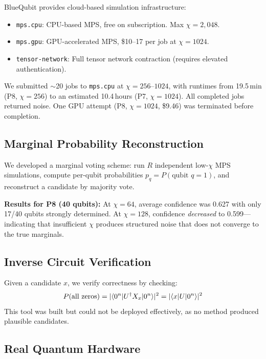 \documentclass[11pt,a4paper]{article}
\newcommand{\bd}{\chi}
\begin{document}
BlueQubit provides cloud-based simulation infrastructure:
\begin{itemize}[nosep]
    \item \texttt{mps.cpu}: CPU-based MPS, free on subscription. Max $\bd = 2{,}048$.
    \item \texttt{mps.gpu}: GPU-accelerated MPS, \$10--17 per job at $\bd = 1024$.
    \item \texttt{tensor-network}: Full tensor network contraction (requires elevated authentication).
\end{itemize}

We submitted $\sim$20 jobs to \texttt{mps.cpu} at $\bd = 256$--$1024$, with runtimes from 19.5\,min (P8, $\bd = 256$) to an estimated 10.4\,hours (P7, $\bd = 1024$). All completed jobs returned noise. One GPU attempt (P8, $\bd = 1024$, \$9.46) was terminated before completion.

\subsection{Marginal Probability Reconstruction}
\label{sec:marginals}

We developed a marginal voting scheme: run $R$ independent low-$\bd$ MPS simulations, compute per-qubit probabilities $p_q = P(\text{qubit } q = 1)$, and reconstruct a candidate by majority vote.

\textbf{Results for P8 (40 qubits):} At $\bd = 64$, average confidence was 0.627 with only 17/40 qubits strongly determined. At $\bd = 128$, confidence \emph{decreased} to 0.599---indicating that insufficient $\bd$ produces structured noise that does not converge to the true marginals.

\subsection{Inverse Circuit Verification}
\label{sec:inverse}

Given a candidate $x$, we verify correctness by checking:
\begin{equation}
P(\text{all zeros}) = |\!\braket{0^n | U^\dagger X_x | 0^n}\!|^2 = |\!\braket{x | U | 0^n}\!|^2
\end{equation}
This tool was built but could not be deployed effectively, as no method produced plausible candidates.

\subsection{Real Quantum Hardware}
\label{sec:hardware}
\end{document}
